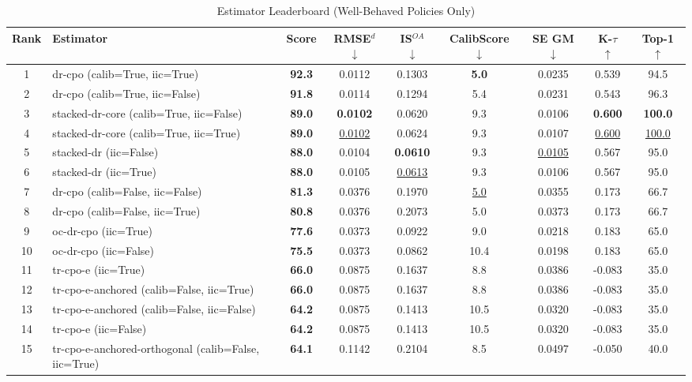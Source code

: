 \begin{table}[htbp]
\centering
\caption{Estimator Leaderboard (Well-Behaved Policies Only)}
\label{tab:leaderboard}
\begin{tabular}{cl|c|cccccc}
\toprule
Rank & Estimator & Score & RMSE$^d$ $\downarrow$ & IS$^{OA}$ $\downarrow$ & CalibScore $\downarrow$ & SE GM $\downarrow$ & K-$\tau$ $\uparrow$ & Top-1 $\uparrow$ \\
\midrule
1 & dr-cpo (calib=True, iic=True) & \textbf{92.3} & 0.0112 & 0.1303 & \textbf{5.0} & 0.0235 & 0.539 & 94.5 \\
2 & dr-cpo (calib=True, iic=False) & \textbf{91.8} & 0.0114 & 0.1294 & 5.4 & 0.0231 & 0.543 & 96.3 \\
3 & stacked-dr-core (calib=True, iic=False) & \textbf{89.0} & \textbf{0.0102} & 0.0620 & 9.3 & 0.0106 & \textbf{0.600} & \textbf{100.0} \\
4 & stacked-dr-core (calib=True, iic=True) & \textbf{89.0} & \underline{0.0102} & 0.0624 & 9.3 & 0.0107 & \underline{0.600} & \underline{100.0} \\
5 & stacked-dr (iic=False) & \textbf{88.0} & 0.0104 & \textbf{0.0610} & 9.3 & \underline{0.0105} & 0.567 & 95.0 \\
6 & stacked-dr (iic=True) & \textbf{88.0} & 0.0105 & \underline{0.0613} & 9.3 & 0.0106 & 0.567 & 95.0 \\
7 & dr-cpo (calib=False, iic=False) & \textbf{81.3} & 0.0376 & 0.1970 & \underline{5.0} & 0.0355 & 0.173 & 66.7 \\
8 & dr-cpo (calib=False, iic=True) & \textbf{80.8} & 0.0376 & 0.2073 & 5.0 & 0.0373 & 0.173 & 66.7 \\
9 & oc-dr-cpo (iic=True) & \textbf{77.6} & 0.0373 & 0.0922 & 9.0 & 0.0218 & 0.183 & 65.0 \\
10 & oc-dr-cpo (iic=False) & \textbf{75.5} & 0.0373 & 0.0862 & 10.4 & 0.0198 & 0.183 & 65.0 \\
11 & tr-cpo-e (iic=True) & \textbf{66.0} & 0.0875 & 0.1637 & 8.8 & 0.0386 & -0.083 & 35.0 \\
12 & tr-cpo-e-anchored (calib=False, iic=True) & \textbf{66.0} & 0.0875 & 0.1637 & 8.8 & 0.0386 & -0.083 & 35.0 \\
13 & tr-cpo-e-anchored (calib=False, iic=False) & \textbf{64.2} & 0.0875 & 0.1413 & 10.5 & 0.0320 & -0.083 & 35.0 \\
14 & tr-cpo-e (iic=False) & \textbf{64.2} & 0.0875 & 0.1413 & 10.5 & 0.0320 & -0.083 & 35.0 \\
15 & tr-cpo-e-anchored-orthogonal (calib=False, iic=True) & \textbf{64.1} & 0.1142 & 0.2104 & 8.5 & 0.0497 & -0.050 & 40.0 \\

\end{tabular}
\end{table}

